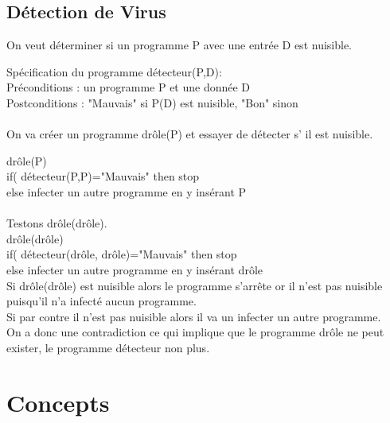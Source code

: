 \documentclass[11pt,a4paper]{article}
\begin{document}

\subsection{Détection de Virus}
\label{sub:d_tection_de_virus}
On veut déterminer si un programme P avec une entrée D est nuisible.

Spécification du programme détecteur(P,D):\\
Préconditions : un programme P et une donnée D\\
Postconditions : "Mauvais" si P(D) est nuisible,
		"Bon" sinon

\paragraph{}On va créer un programme drôle(P) et essayer de détecter s’ il est nuisible.

drôle(P) \\
if( détecteur(P,P)="Mauvais" then stop \\
else infecter un autre programme en y insérant P

\paragraph{}
Testons drôle(drôle). \\
drôle(drôle) \\
if( détecteur(drôle, drôle)="Mauvais" then stop \\
else infecter un autre programme en y insérant drôle \\

Si drôle(drôle) est nuisible alors le programme s'arrête or il n'est pas nuisible
puisqu'il n'a infecté aucun programme.\\
Si par contre il n'est pas nuisible alors il va un infecter un autre programme.\\
On a donc une contradiction ce qui implique que le programme drôle ne peut exister,
le programme détecteur non plus.


\section{Concepts}
\label{sec:concepts}

\end{document}
